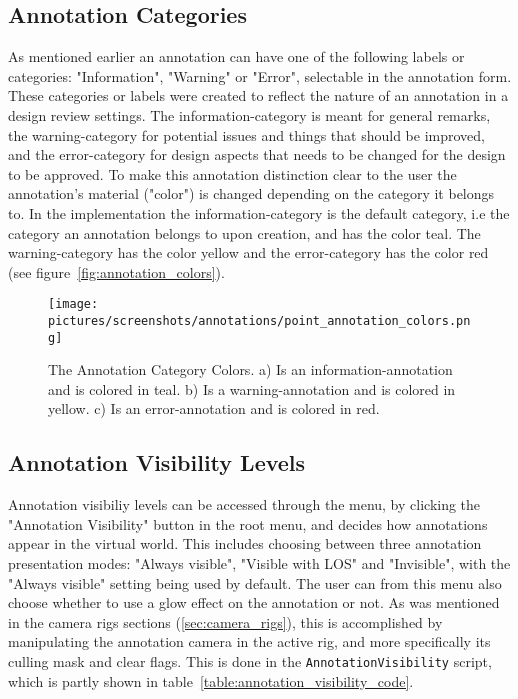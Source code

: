 \subsection{Annotation Categories}
As mentioned earlier an annotation can have one of the following labels or categories: "Information", "Warning" or "Error", selectable in the annotation form.
These categories or labels were created to reflect the nature of an annotation in a design review settings. 
The information-category is meant for general remarks, the warning-category for potential issues and things that should be improved, and the
error-category for design aspects that needs to be changed for the design to be approved. To make this annotation distinction clear to the user
the annotation's material ("color") is changed depending on the category it belongs to. In the implementation the information-category is
the default category, i.e the category an annotation belongs to upon creation, and has the color teal. The warning-category has the color yellow and
the error-category has the color red (see figure~\vref{fig:annotation_colors}).

\begin{figure}%
	\texttt{[image: pictures/screenshots/annotations/point\_annotation\_colors.png]}
	\caption[The Annotation Category Colors]{The Annotation Category Colors. a) Is an information-annotation and is colored in teal. 
			b) Is a warning-annotation and is colored in yellow. c) Is an error-annotation and is colored in red.}
	\label{fig:annotation_colors}
\end{figure} 

\subsection{Annotation Visibility Levels}
\label{sec:annotations}
Annotation visibiliy levels can be accessed through the menu, by clicking the "Annotation Visibility" button in the root menu, 
and decides how annotations appear in the virtual world. This includes choosing between three annotation presentation modes: "Always visible", "Visible with LOS" and 
"Invisible", with the "Always visible" setting being used by default. 
The user can from this menu also choose whether to use a glow effect on the annotation or not. 
As was mentioned in the camera rigs sections (\ref{sec:camera_rigs}), this is 
accomplished by manipulating the annotation camera in the active rig, and more specifically its culling mask and clear flags. 
This is done in the \texttt{AnnotationVisibility} script, which is partly shown in table~\vref{table:annotation_visibility_code}.


